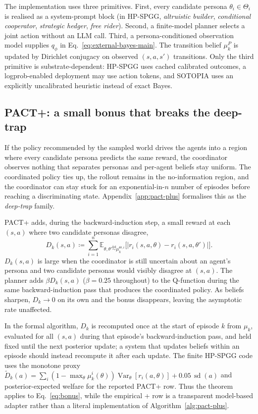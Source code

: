 \documentclass{article}
\def\textsuperscript#1{#1}%
\begin{document}
The implementation uses three primitives. First, every candidate persona $\theta_i\in\Theta_i$ is realised as a system-prompt block (in HP-SPGG, \emph{altruistic builder}, \emph{conditional cooperator}, \emph{strategic hedger}, \emph{free rider}). Second, a finite-model planner selects a joint action without an LLM call. Third, a persona-conditioned observation model supplies $q_\phi$ in Eq.~\eqref{eq:external-bayes-main}. The transition belief $\mu^P_k$ is updated by Dirichlet conjugacy on observed $(s,a,s')$ transitions. Only the third primitive is substrate-dependent: HP-SPGG uses cached calibrated outcomes, a logprob-enabled deployment may use action tokens, and SOTOPIA uses an explicitly uncalibrated heuristic instead of exact Bayes.

\subsection{PACT\textsuperscript{+}: a small bonus that breaks the deep-trap}
\label{sec:pact-plus-algo}

If the policy recommended by the sampled world drives the agents into a region where every candidate persona predicts the same reward, the coordinator observes nothing that separates personas and per-agent beliefs stay uniform. The coordinated policy ties up, the rollout remains in the no-information region, and the coordinator can stay stuck for an exponential-in-$n$ number of episodes before reaching a discriminating state. Appendix~\ref{app:pact-plus} formalises this as the \emph{deep-trap} family.

PACT\textsuperscript{+} adds, during the backward-induction step, a small reward at each $(s,a)$ where two candidate personas disagree,
\begin{equation}
\label{eq:bonus}
D_k(s,a)\!\coloneqq\!\sum_{i=1}^n\mathbb{E}_{\theta,\theta'\!\stackrel{\mathrm{iid}}{\sim}\!\mu_k^{\Theta,i}}\!\big[|r_i(s,a,\theta)\!-\!r_i(s,a,\theta')|\big].
\end{equation}
$D_k(s,a)$ is large when the coordinator is still uncertain about an agent's persona and two candidate personas would visibly disagree at $(s,a)$. The planner adds $\beta D_k(s,a)$ ($\beta\!=\!0.25$ throughout) to the Q-function during the same backward-induction pass that produces the coordinated policy. As beliefs sharpen, $D_k\!\to\!0$ on its own and the bonus disappears, leaving the asymptotic rate unaffected.

In the formal algorithm, $D_k$ is recomputed once at the start of episode $k$ from $\mu_k$, evaluated for all $(s,a)$ during that episode's backward-induction pass, and held fixed until the next posterior update; a system that updates beliefs within an episode should instead recompute it after each update. The finite HP-SPGG code uses the monotone proxy $\widetilde D_k(a)=\sum_i(1-\max_\theta\mu_k^i(\theta))\operatorname{Var}_\theta[r_i(a,\theta)]+0.05\,\operatorname{sd}(a)$ and posterior-expected welfare for the reported PACT\textsuperscript{+} row. Thus the theorem applies to Eq.~\eqref{eq:bonus}, while the empirical \textsuperscript{+} row is a transparent model-based adapter rather than a literal implementation of Algorithm~\ref{alg:pact-plus}.
\end{document}
